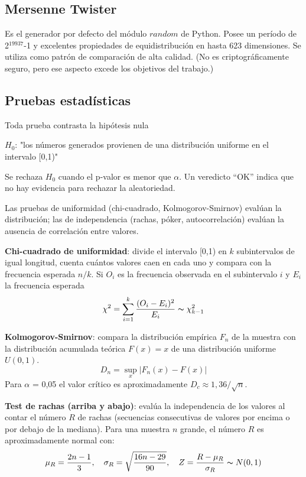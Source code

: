 \documentclass{article}
\begin{document}
\subsection{Mersenne Twister}
Es el generador por defecto del módulo $random$ de Python. Posee un período de 2$^{19937}$-1 y excelentes propiedades de equidistribución en hasta 623 dimensiones. Se utiliza como patrón de comparación de alta calidad. (No es criptográficamente seguro, pero ese aspecto excede los objetivos del trabajo.)


\subsection{Pruebas estadísticas}
Toda prueba contrasta la hipótesis nula
\begin{center}
$H_0$: "los números generados provienen de una distribución uniforme en el intervalo [0,1)"
\end{center}

Se rechaza $H_0$ cuando el p-valor es menor que $\alpha$. Un veredicto “OK” indica que no hay evidencia para rechazar la aleatoriedad. 

Las pruebas de uniformidad (chi-cuadrado, Kolmogorov-Smirnov) evalúan la distribución; las de independencia (rachas, póker, autocorrelación) evalúan la ausencia de correlación entre valores.

\textbf{Chi-cuadrado de uniformidad}: divide el intervalo [0,1) en $k$ subintervalos de igual longitud, cuenta cuántos valores caen en cada uno y compara con la frecuencia esperada $n/k$.
Si $O_i$ es la frecuencia observada en el subintervalo $i$ y $E_i$ la frecuencia esperada
\begin{equation}
\chi^2 = \sum_{i=1}^k \frac{(O_i - E_i)^2}{E_i} \thicksim \chi^2_{k-1}
\end{equation}

\textbf{Kolmogorov-Smirnov}: compara la distribución empírica $F_n$ de la muestra con la distribución acumulada teórica $F(x)=x$ de una distribución uniforme $U(0,1)$.
\begin{equation}
D_n = \sup_x |F_n(x) - F(x)|
\end{equation}
Para $\alpha$ = 0,05 el valor crítico es aproximadamente $D_c \approx 1,36 / \sqrt{n}$.


\textbf{Test de rachas (arriba y abajo)}: evalúa la independencia de los valores al contar el número $R$ de rachas (secuencias consecutivas de valores por encima o por debajo de la mediana). Para una muestra $n$ grande, el número $R$ es aproximadamente normal con:
\begin{equation}
\mu_R = \frac{2n - 1}{3}, \quad \sigma_R = \sqrt{\frac{16n - 29}{90}}, \quad Z = \frac{R - \mu_R}{\sigma_R} \thicksim N(0,1)
\end{equation}
\end{document}
